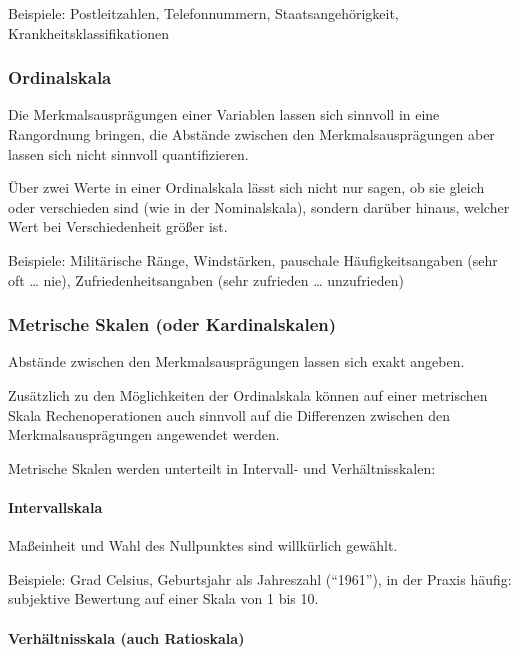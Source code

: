 \documentclass[
  11pt,
  ngerman,
  a4paper,
]{report}
\begin{document}
Beispiele: Postleitzahlen, Telefonnummern, Staatsangehörigkeit, Krankheitsklassifikationen

\hypertarget{ordinalskala}{%
\subsubsection{Ordinalskala}\label{ordinalskala}}

Die Merkmalsausprägungen einer Variablen lassen sich sinnvoll in eine Rangordnung bringen, die Abstände zwischen den Merkmalsausprägungen aber lassen sich nicht sinnvoll quantifizieren.

Über zwei Werte in einer Ordinalskala lässt sich nicht nur sagen, ob sie gleich oder verschieden sind (wie in der Nominalskala), sondern darüber hinaus, welcher Wert bei Verschiedenheit größer ist.

Beispiele: Militärische Ränge, Windstärken, pauschale Häufigkeitsangaben (sehr oft \ldots{} nie), Zufriedenheitsangaben (sehr zufrieden \ldots{} unzufrieden)

\hypertarget{metrische-skalen-oder-kardinalskalen}{%
\subsubsection{Metrische Skalen (oder Kardinalskalen)}\label{metrische-skalen-oder-kardinalskalen}}

Abstände zwischen den Merkmalsausprägungen lassen sich exakt angeben.

Zusätzlich zu den Möglichkeiten der Ordinalskala können auf einer metrischen Skala Rechenoperationen auch sinnvoll auf die Differenzen zwischen den Merkmalsausprägungen angewendet werden.

Metrische Skalen werden unterteilt in Intervall- und Verhältnisskalen:

\hypertarget{intervallskala}{%
\paragraph{Intervallskala}\label{intervallskala}}

Maßeinheit und Wahl des Nullpunktes sind willkürlich gewählt.

Beispiele: Grad Celsius, Geburtsjahr als Jahreszahl (\enquote{1961}), in der Praxis häufig: subjektive Bewertung auf einer Skala von 1 bis 10.

\hypertarget{verhuxe4ltnisskala-auch-ratioskala}{%
\paragraph{Verhältnisskala (auch Ratioskala)}\label{verhuxe4ltnisskala-auch-ratioskala}}
\end{document}
